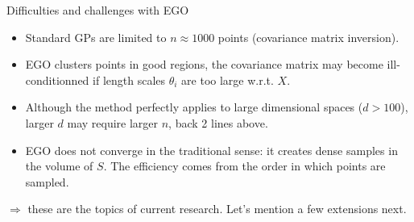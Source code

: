 \documentclass{beamer}
\begin{document}
% 
\begin{frame}{}
\begin{exampleblock}{Difficulties and challenges with EGO}
\begin{itemize}
\item Standard GPs are limited to $n \approx 1000$ points (covariance matrix inversion).
\item EGO clusters points in good regions, the covariance matrix may become ill-conditionned 
if length scales $\theta_i$ are too large w.r.t. $X$.
\item Although the method perfectly applies to large dimensional spaces ($d>100$), larger $d$ 
may require larger $n$, back 2 lines above.
\item EGO does not converge in the traditional sense: it creates dense samples in the volume of $S$. 
The efficiency comes from the order in which points are sampled.
\end{itemize}
$\Rightarrow$ these are the topics of current research. Let's mention a few extensions next.
\end{exampleblock}
\end{frame}
\end{document}
